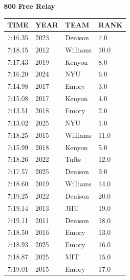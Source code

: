 \begin{table}[H]
\centering
\begin{minipage}[t]{0.6\textwidth}
\centering
\textbf{800 Free Relay}\\[0.1cm]
\begin{tabular}{@{}p{1.8cm}p{1.2cm}p{1.4cm}p{0.8cm}@{}}
\hline
    \textbf{TIME} & \textbf{YEAR} & \textbf{TEAM} & \textbf{RANK} \\
\hline
    7:16.35 & 2023 & Denison & 7.0 \\
    7:18.15 & 2012 & Williams & 10.0 \\
    7:17.43 & 2019 & Kenyon & 8.0 \\
    7:16.20 & 2024 & NYU & 6.0 \\
    7:14.98 & 2017 & Emory & 3.0 \\
    7:15.08 & 2017 & Kenyon & 4.0 \\
    7:13.51 & 2018 & Emory & 2.0 \\
    7:13.02 & 2025 & NYU & 1.0 \\
    7:18.25 & 2015 & Williams & 11.0 \\
    7:15.99 & 2018 & Kenyon & 5.0 \\
    7:18.26 & 2022 & Tufts & 12.0 \\
    7:17.57 & 2025 & Denison & 9.0 \\
    7:18.60 & 2019 & Williams & 14.0 \\
    7:19.25 & 2022 & Denison & 20.0 \\
    7:19.14 & 2013 & JHU & 19.0 \\
    7:19.11 & 2011 & Denison & 18.0 \\
    7:18.50 & 2016 & Emory & 13.0 \\
    7:18.93 & 2025 & Emory & 16.0 \\
    7:18.87 & 2025 & MIT & 15.0 \\
    7:19.01 & 2015 & Emory & 17.0 \\
\hline
\end{tabular}
\end{minipage}
\end{table}


